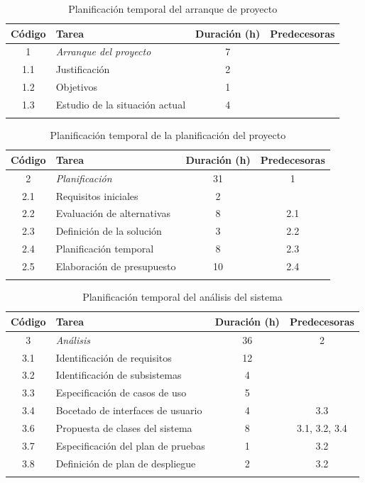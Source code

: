\begin{longtable}{ c p{} c c }
    \hline
    Código & Tarea & Duración (h) & Predecesoras \\
    \hline
    1 & \emph{Arranque del proyecto} & 7 & \\
    1.1 & Justificación & 2 & \\
    1.2 & Objetivos & 1 & \\
    1.3 & Estudio de la situación actual & 4 & \\
    \hline
    \caption{Planificación temporal del arranque de proyecto}
    \label{pt:arranque_proyecto}
\end{longtable}

\begin{longtable}{ c p{} c c }
    \hline
    Código & Tarea & Duración (h) & Predecesoras \\
    \hline
    2 & \emph{Planificación} & 31 & 1 \\
    2.1 & Requisitos iniciales & 2 &  \\
    2.2 & Evaluación de alternativas & 8 & 2.1 \\
    2.3 & Definición de la solución & 3 & 2.2 \\
    2.4 & Planificación temporal & 8 & 2.3 \\
    2.5 & Elaboración de presupuesto & 10 & 2.4 \\
    \hline
    \caption{Planificación temporal de la planificación del proyecto}
    \label{pt:planificacion}
\end{longtable}

\begin{longtable}{ c p{} c c }
    \hline
    Código & Tarea & Duración (h) & Predecesoras \\
    \hline
    3 & \emph{Análisis} & 36 & 2 \\
    3.1 & Identificación de requisitos & 12 &  \\
    3.2 & Identificación de subsistemas & 4 &  \\
    3.3 & Especificación de casos de uso & 5 &  \\
    3.4 & Bocetado de interfaces de usuario & 4 & 3.3 \\
    3.6 & Propuesta de clases del sistema & 8 & 3.1, 3.2, 3.4 \\
    3.7 & Especificación del plan de pruebas & 1 & 3.2 \\
    3.8 & Definición de plan de despliegue & 2 & 3.2 \\
    \hline
    \caption{Planificación temporal del análisis del sistema}
    \label{pt:analisis}
\end{longtable}

